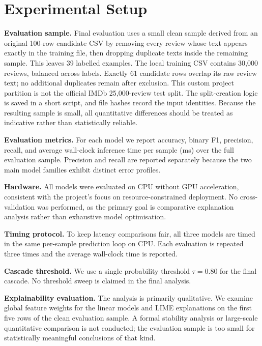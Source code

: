 \documentclass[10pt]{article}
\begin{document}
\section{Experimental Setup}

\textbf{Evaluation sample.}  Final evaluation uses a small clean sample derived
from an original 100-row candidate CSV by removing every review whose text
appears exactly in the training file, then dropping duplicate texts inside the
remaining sample.  This leaves 39 labelled examples.  The local training CSV contains 30,000 reviews, balanced across labels.
Exactly 61 candidate rows overlap its raw review text; no additional
duplicates remain after exclusion. This custom project partition is not the
official IMDb 25,000-review test split. The split-creation logic is saved in
a short script, and file hashes record the input identities.  Because the resulting sample is
small, all quantitative differences should be treated as indicative rather than
statistically reliable.

\textbf{Evaluation metrics.}  For each model we report accuracy, binary F1,
precision, recall, and average wall-clock inference time per sample (ms)
over the full evaluation sample.  Precision and recall are reported separately because
the two main model families exhibit distinct error profiles.

\textbf{Hardware.}  All models were evaluated on CPU without GPU acceleration,
consistent with the project's focus on resource-constrained deployment.  No
cross-validation was performed, as the primary goal is comparative explanation
analysis rather than exhaustive model optimisation.

\textbf{Timing protocol.}  To keep latency comparisons fair, all three models
are timed in the same per-sample prediction loop on CPU.  Each evaluation is
repeated three times and the average wall-clock time is reported.

\textbf{Cascade threshold.}  We use a single probability threshold
$\tau = 0.80$ for the final cascade.  No threshold sweep is claimed in the
final analysis.

\textbf{Explainability evaluation.}  The analysis is primarily qualitative.
We examine global feature weights for the linear models and LIME explanations
on the first five rows of the clean evaluation sample.  A formal stability
analysis or large-scale quantitative
comparison is not conducted; the evaluation sample is too small for statistically
meaningful conclusions of that kind.
\end{document}
